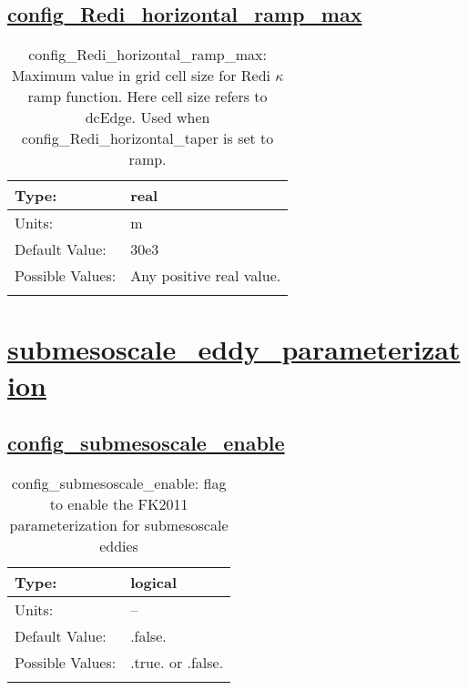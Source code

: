\subsection[config\_Redi\_horizontal\_ramp\_max]{\hyperref[sec:nm_tab_Redi_isopycnal_mixing]{config\_Redi\_horizontal\_ramp\_max}}
\label{subsec:nm_sec_config_Redi_horizontal_ramp_max}
\begin{center}
\begin{longtable}{| p{2.0in} || p{4.0in} |}
    \hline
    Type: & real \\
    \hline
    Units: & \si{m} \\
    \hline
    Default Value: & 30e3 \\
    \hline
    Possible Values: & Any positive real value. \\
    \hline
    \caption{config\_Redi\_horizontal\_ramp\_max: Maximum value in grid cell size for Redi $\kappa$ ramp function.  Here cell size refers to dcEdge. Used when config\_Redi\_horizontal\_taper is set to ramp.}
\end{longtable}
\end{center}
\section[submesoscale\_eddy\_parameterization]{\hyperref[sec:nm_tab_submesoscale_eddy_parameterization]{submesoscale\_eddy\_parameterization}}
\label{sec:nm_sec_submesoscale_eddy_parameterization}
\subsection[config\_submesoscale\_enable]{\hyperref[sec:nm_tab_submesoscale_eddy_parameterization]{config\_submesoscale\_enable}}
\label{subsec:nm_sec_config_submesoscale_enable}
\begin{center}
\begin{longtable}{| p{2.0in} || p{4.0in} |}
    \hline
    Type: & logical \\
    \hline
    Units: & -- \\
    \hline
    Default Value: & .false. \\
    \hline
    Possible Values: & .true. or .false. \\
    \hline
    \caption{config\_submesoscale\_enable: flag to enable the FK2011 parameterization for submesoscale eddies}
\end{longtable}
\end{center}
